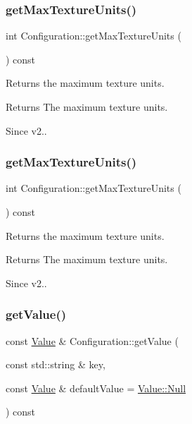 \subsubsection{\texorpdfstring{get\+Max\+Texture\+Units()}{getMaxTextureUnits()}\hspace{0.1cm}{\footnotesize\ttfamily [1/2]}}
{\footnotesize\ttfamily int Configuration\+::get\+Max\+Texture\+Units (\begin{DoxyParamCaption}{ }\end{DoxyParamCaption}) const}

Returns the maximum texture units.

\begin{DoxyReturn}{Returns}
The maximum texture units. 
\end{DoxyReturn}
\begin{DoxySince}{Since}
v2.. 
\end{DoxySince}
\mbox{\label{classConfiguration_ab6b3b10e44ce28029bb9c157a339a91f}} 
\subsubsection{\texorpdfstring{get\+Max\+Texture\+Units()}{getMaxTextureUnits()}\hspace{0.1cm}{\footnotesize\ttfamily [2/2]}}
{\footnotesize\ttfamily int Configuration\+::get\+Max\+Texture\+Units (\begin{DoxyParamCaption}{ }\end{DoxyParamCaption}) const}

Returns the maximum texture units.

\begin{DoxyReturn}{Returns}
The maximum texture units. 
\end{DoxyReturn}
\begin{DoxySince}{Since}
v2.. 
\end{DoxySince}
\mbox{\label{classConfiguration_ab8b89fab93a9c31798863a720d7ce290}} 
\subsubsection{\texorpdfstring{get\+Value()}{getValue()}\hspace{0.1cm}{\footnotesize\ttfamily [1/2]}}
{\footnotesize\ttfamily const \hyperlink{classValue}{Value} \& Configuration\+::get\+Value (\begin{DoxyParamCaption}\item[{const std\+::string \&}]{key,  }\item[{const \hyperlink{classValue}{Value} \&}]{default\+Value = {\ttfamily \hyperlink{classValue_af01b27b1c6ca5f4577a4b6c10a186f59}{Value\+::\+Null}} }\end{DoxyParamCaption}) const}

